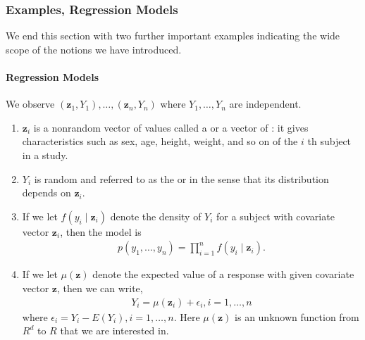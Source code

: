 \documentclass{article}
\begin{document}
\subsubsection{Examples, Regression Models}
We end this section with two further important examples indicating the wide scope of the notions we have introduced.
\paragraph{Regression Models}\label{sssec:regress}
We observe $\left(\mathbf{z}_{1}, Y_{1}\right), \ldots,\left(\mathbf{z}_{n}, Y_{n}\right)$ where $Y_{1}, \ldots, Y_{n}$ are independent. 
\begin{enumerate}
    \item $\mathbf{z}_{i}$ is a nonrandom vector of values called a  or a vector of : it gives characteristics such as sex, age, height, weight, and so on of the $i$ th subject in a study. 
    \item $Y_{i}$ is random and referred to as the  or  in the sense that its distribution depends on $\mathbf{z}_{i}$.
    \item If we let $f\left(y_{i} \mid \mathbf{z}_{i}\right)$ denote the density of $Y_{i}$ for a subject with covariate vector $\mathbf{z}_{i}$, then the model is
\begin{align*}
p\left(y_{1}, \ldots, y_{n}\right)=\prod_{i=1}^{n} f\left(y_{i} \mid \mathbf{z}_{i}\right) .
\end{align*}
\item If we let $\mu(\mathbf{z})$ denote the expected value of a response with given covariate vector $\mathbf{z}$, then we can write,
\begin{align*}
Y_{i}=\mu\left(\mathbf{z}_{i}\right)+\epsilon_{i}, i=1, \ldots, n
\end{align*}
where $\epsilon_{i}=Y_{i}-E\left(Y_{i}\right), i=1, \ldots, n$. Here $\mu(\mathbf{z})$ is an unknown function from $R^{d}$ to $R$ that we are interested in.
\end{enumerate} 
\end{document}
